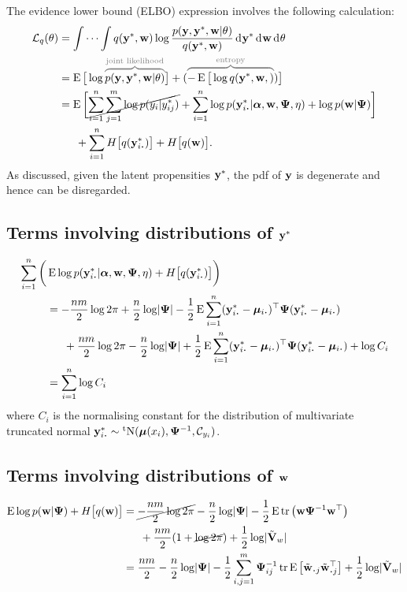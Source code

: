 The evidence lower bound (ELBO) expression involves the following calculation:
\begin{align*}
  \cL_q(\theta) &= \idotsint q(\by^*,\bw) 
  \log \frac{p(\by,\by^*,\bw|\theta)}{q(\by^*,\bw)}
  \dint\by^* \dint\bw \dint\theta \\
  &= \E \big[ \log \myoverbrace{p(\by,\by^*,\bw|\theta)}{\text{joint likelihood}} \big]
  +
  (\myoverbrace{-\E \big[ \log q(\by^*,\bw,)}{\text{entropy}}) \big] \\
  &= \E\bigg[
  \cancel{\sum_{i=1}^n \sum_{j=1}^m \log  p(y_{i}|y_{ij}^*)} + 
  \sum_{i=1}^n \log  p(\by_{i \bigcdot}^*|\balpha,\bw,\bPsi,\eta) +
  \log p(\bw|\bPsi)  
  \bigg] \\
  &\phantom{==} 
  + \sum_{i=1}^n H\big[q(\by^*_{i \bigcdot}) \big]
  + H\big[q(\bw) \big].
\end{align*}
As discussed, given the latent propensities ${\mathbf y}^*$, the pdf of ${\mathbf y}$ is degenerate and hence can be disregarded.  

\subsection{Terms involving distributions of \texorpdfstring{${\mathbf y}^*$}{$y^*$}}

\begin{align*}
  \sum_{i=1}^n  \bigg( &
  \E  \log p(\by_{i \bigcdot}^*|\balpha,\bw,\bPsi,\eta) 
  + H \big[q(\by^*_{i \bigcdot}) \big] 
  \bigg) \\
  &=  -\half[nm]\log 2\pi + \half[n] \log \abs{\bPsi} - \half \E \sum_{i=1}^n (\by^*_{i \bigcdot} - \bmu_{i \bigcdot})^\top \bPsi (\by^*_{i \bigcdot} - \bmu_{i \bigcdot}) \\
  &\phantom{==} +\half[nm]\log 2\pi - \half[n] \log \abs{\bPsi} + \half \E \sum_{i=1}^n (\by^*_{i \bigcdot} - \bmu_{i \bigcdot})^\top \bPsi (\by^*_{i \bigcdot} - \bmu_{i \bigcdot}) + \log C_i  \\
   &=\sum_{i=1}^n \log C_i 
\end{align*}
where $C_i$ is the normalising constant for the distribution of multivariate truncated normal $\by_{i \bigcdot}^* \sim \tN(\bmu(x_i),\bPsi^{-1},\cC_{y_i})$.

\subsection{Terms involving distributions of ${\mathbf w}$}

\begin{align*}
  \E \log p(\bw|\bPsi) + H \big[q(\bw) \big] 
  &= \cancel{-\half[nm]\log 2\pi} - \half[n]\log\abs{\bPsi} - \half\E\tr \big( \bw \bPsi^{-1} \bw^\top \big) \\
  &\phantom{==} + \half[nm](1 + \cancel{\log 2\pi}) + \half\log\abs{\tilde\bV_w} \\
  &=  \half[nm] - \half[n]\log\abs{\bPsi} 
  - \half \sum_{i,j=1}^m \bPsi^{-1}_{ij}  \tr \E \big[\tilde\bw_{\bigcdot j}\tilde\bw_{\bigcdot j}^\top\big]
  + \half\log\abs{\tilde\bV_w}
\end{align*}
